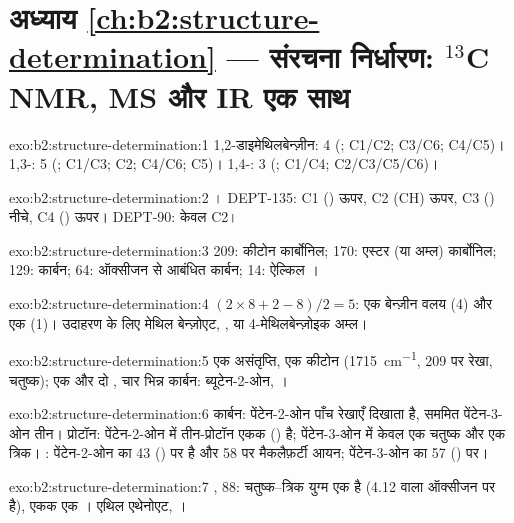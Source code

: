 \section*{अध्याय \ref{ch:b2:structure-determination} --- संरचना निर्धारण: \texorpdfstring{$^{13}$C}{13C} NMR, MS और IR एक साथ}

\begin{solution}{exo:b2:structure-determination:1}
1,2-डाइमेथिलबेन्ज़ीन: 4 (; C1/C2; C3/C6; C4/C5)। 1,3-: 5 (; C1/C3; C2; C4/C6; C5)।
1,4-: 3 (; C1/C4; C2/C3/C5/C6)।
\end{solution}

\begin{solution}{exo:b2:structure-determination:2}
। DEPT-135: C1 () ऊपर, C2 (CH) ऊपर, C3 () नीचे, C4 () ऊपर।
DEPT-90: केवल C2।
\end{solution}

\begin{solution}{exo:b2:structure-determination:3}
209: कीटोन कार्बोनिल; 170: एस्टर (या अम्ल) कार्बोनिल; 129:  कार्बन; 64: ऑक्सीजन से आबंधित
कार्बन; 14: ऐल्किल ।
\end{solution}

\begin{solution}{exo:b2:structure-determination:4}
$(2 \times 8 + 2 - 8)/2 = 5$: एक बेन्ज़ीन वलय (4) और एक  (1)। उदाहरण के लिए मेथिल बेन्ज़ोएट,
, या 4-मेथिलबेन्ज़ोइक अम्ल।
\end{solution}

\begin{solution}{exo:b2:structure-determination:5}
एक असंतृप्ति, एक कीटोन (\qty{1715}{cm^{-1}}, 209 पर रेखा, चतुष्क); एक  और दो
, चार भिन्न कार्बन: ब्यूटेन-2-ओन, ।
\end{solution}

\begin{solution}{exo:b2:structure-determination:6}
कार्बन: पेंटेन-2-ओन पाँच रेखाएँ दिखाता है, सममित पेंटेन-3-ओन तीन। प्रोटॉन: पेंटेन-2-ओन में
तीन-प्रोटॉन एकक () है; पेंटेन-3-ओन में केवल एक चतुष्क और एक त्रिक। : पेंटेन-2-ओन
का  43 () पर है और 58 पर मैकलैफ़र्टी आयन; पेंटेन-3-ओन का  57
() पर।
\end{solution}

\begin{solution}{exo:b2:structure-determination:7}
, 88: चतुष्क--त्रिक युग्म एक  है (4.12 वाला  ऑक्सीजन पर है),
एकक एक । एथिल एथेनोएट, ।
\end{solution}

